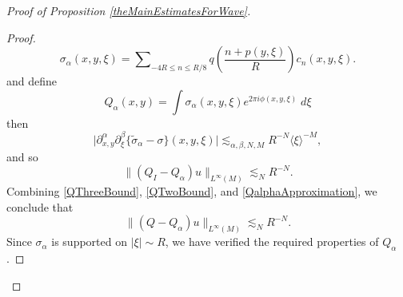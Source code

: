 \begin{proof}[Proof of Proposition \ref{theMainEstimatesForWave}]
\begin{proof}
    \begin{equation} \sigma_\alpha(x,y,\xi) = \sum\nolimits_{-4R \leq n \leq R/8} q \left( \frac{n + p(y,\xi)}{R} \right) c_n(x,y,\xi). \end{equation}
    and define
    \begin{equation} Q_\alpha(x,y) = \int \sigma_\alpha(x,y,\xi) e^{2 \pi i \phi(x,y,\xi)}\; d\xi \end{equation}
    then
    \begin{equation} \Big|\partial_{x,y}^\alpha \partial_\xi^\beta \big\{ \tilde{\sigma}_\alpha - \sigma \big\}(x,y,\xi) \Big| \lesssim_{\alpha,\beta,N,M} R^{-N} \langle \xi \rangle^{-M}, \end{equation}
    and so
    \begin{equation} \label{QalphaApproximation}
        \| ( Q_I - Q_\alpha ) u \|_{L^\infty(M)} \lesssim_N R^{-N}.
    \end{equation}
    Combining \eqref{QThreeBound}, \eqref{QTwoBound}, and \eqref{QalphaApproximation}, we conclude that
    \begin{equation} \label{QApproximationTheorem}
        \| (Q - Q_\alpha) u \|_{L^\infty(M)} \lesssim_N R^{-N}.
    \end{equation}
    Since $\sigma_\alpha$ is supported on $|\xi| \sim R$, we have verified the required properties of $Q_\alpha$.


\end{proof}
\end{proof}

